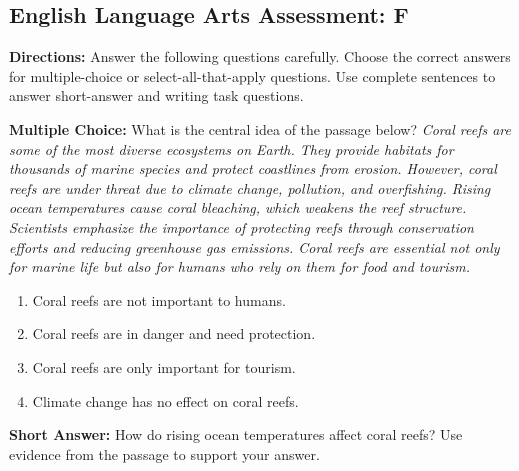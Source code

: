 \documentclass[12pt]{article}
\begin{document}
\subsection*{English Language Arts Assessment: F}
\onehalfspacing

\begin{tcolorbox}[colframe=black!50, colback=white, title=Assessment Directions]
\textbf{Directions:} Answer the following questions carefully. Choose the correct answers for multiple-choice or select-all-that-apply questions. Use complete sentences to answer short-answer and writing task questions.
\end{tcolorbox}

\begin{tcolorbox}[colframe=black!50, colback=white, title=Question 1]
\textbf{Multiple Choice:} What is the central idea of the passage below?  
\textit{Coral reefs are some of the most diverse ecosystems on Earth. They provide habitats for thousands of marine species and protect coastlines from erosion. However, coral reefs are under threat due to climate change, pollution, and overfishing. Rising ocean temperatures cause coral bleaching, which weakens the reef structure. Scientists emphasize the importance of protecting reefs through conservation efforts and reducing greenhouse gas emissions. Coral reefs are essential not only for marine life but also for humans who rely on them for food and tourism.}  
\begin{enumerate}[label=(\Alph*)]
\item Coral reefs are not important to humans.  
\item Coral reefs are in danger and need protection.  
\item Coral reefs are only important for tourism.  
\item Climate change has no effect on coral reefs.  
\end{enumerate}
\end{tcolorbox}

\begin{tcolorbox}[colframe=black!50, colback=white, title=Question 2]
\textbf{Short Answer:} How do rising ocean temperatures affect coral reefs? Use evidence from the passage to support your answer.  

\vspace{2em}
\\[0.8cm] \underline{\hspace{15.8cm}}  
    \\[0.8cm] \underline{\hspace{15.8cm}}  
\end{tcolorbox}
\end{document}
